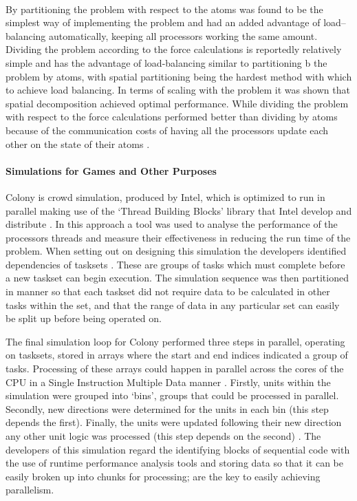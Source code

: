 \documentclass[main.tex]{subfiles}
\begin{document}
{{\paragraph{}By partitioning the problem with respect to the atoms was found to be the simplest way of implementing the problem and had an added advantage of load–balancing automatically, keeping all processors working the same amount. Dividing the problem according to the force calculations is reportedly relatively simple and has the advantage of load-balancing similar to partitioning b the problem by atoms, with spatial partitioning being the hardest method with which to achieve load balancing. In terms of scaling with the problem it was shown that spatial decomposition achieved optimal performance. While dividing the problem with respect to the force calculations performed better than dividing by atoms because of the communication costs of having all the processors update each other on the state of their atoms \cite{Plimpton1995}.

\paragraph{Simulations for Games and Other Purposes} Colony is crowd simulation, produced by Intel, which is optimized to run in parallel making use of the `Thread Building Blocks' library that Intel develop and distribute \cite{KyleIntel}. In this approach a tool was used to analyse the performance of the processors threads and measure their effectiveness in reducing the run time of the problem. When setting out on designing this simulation the developers identified dependencies of tasksets \cite{KyleIntel}. These are groups of tasks which must complete before a new taskset can begin execution. The simulation sequence was then partitioned in manner so that each taskset did not require data to be calculated in other tasks within the set, and that the range of data in any particular set can easily be split up before being operated on.

The final simulation loop for Colony performed three steps in parallel, operating on tasksets, stored in arrays where the start and end indices indicated a group of tasks. Processing of these arrays could happen in parallel across the cores of the CPU in a Single Instruction Multiple Data manner \cite{KyleIntel}. Firstly, units within the simulation were grouped into `bins', groups that could be processed in parallel. Secondly, new directions were determined for the units in each bin (this step depends the first). Finally, the units were updated following their new direction any other unit logic was processed (this step depends on the second) \cite{KyleIntel}. The developers of this simulation regard the identifying blocks of sequential code with the use of runtime performance analysis tools and storing data so that it can be easily broken up into chunks for processing; are the  key to easily achieving parallelism.

}}
\end{document}
